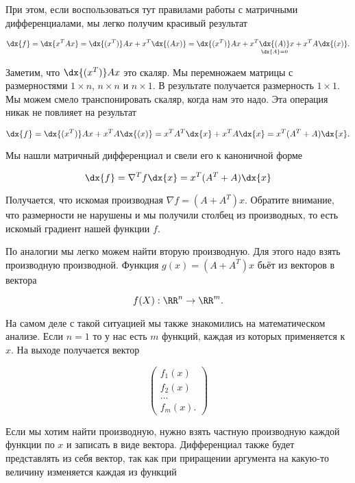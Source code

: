 \begin{sol}
\begin{enumerate}
При этом, если воспользоваться тут правилами работы с матричными дифференциалами, мы легко получим красивый результат

\[
\dx{f} =  \dx{x^T A x} =  \dx{(x^T)} A x + x^T \dx{(Ax)} =  \dx{(x^T)} A x + x^T \underset{\dx{A} = 0}{\dx{(A)}} x + x^T A \dx{(x)}.
\]

Заметим, что $\dx{(x^T)} A x$ это скаляр. Мы перемножаем матрицы с размерностями $1 \times n$, $n \times n$ и $n \times 1$. В результате получается размерность $1 \times 1$. Мы можем смело транспонировать скаляр, когда нам это надо. Эта операция никак не повлияет на результат

\[
\dx{f} = \dx{(x^T)} A x + x^T A \dx{(x)} = x^T A^T \dx{x}  + x^T A \dx{x} = x^T(A^T + A) \dx{x}.
\]

Мы нашли матричный дифференциал и свели его к каноничной форме 

\[
\dx{f} = \nabla^T f \dx{x} = x^T(A^T + A) \dx{x}
\]

Получается, что искомая производная $\nabla f = (A + A^T) x$. Обратите внимание, что размерности не нарушены и мы получили столбец из производных, то есть искомый градиент нашей функции $f$. 

По аналогии мы легко можем найти вторую производную. Для этого надо взять производную производной. Функция $g(x) = (A + A^T) x$ бьёт из векторов в вектора

\[
f(X) : \RR^n \to \RR^m.
\]

На самом деле с такой ситуацией мы также знакомились на математическом анализе. Если $n=1$ то у нас есть $m$ функций, каждая из которых применяется к $x$. На выходе получается вектор 

\[
\begin{pmatrix} f_1(x) \\ f_2(x) \\ \ldots  \\ f_m(x). \end{pmatrix}
\]

Если мы хотим найти производную, нужно взять частную производную каждой функции по $x$ и записать в виде вектора. Дифференциал также будет представлять из себя вектор, так как при приращении аргумента на какую-то величину изменяется каждая из функций 


\end{enumerate}
\end{sol}

